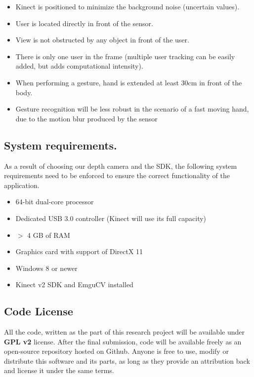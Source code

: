 \documentclass[a4paper,11pt,oneside]{article}
\begin{document}
  \begin{itemize}
 \item Kinect is positioned to minimize the background noise (uncertain values).
  \item User is located directly in front of the sensor.
  \item View is not obstructed by any object in front of the user.
  \item There is only one user in the frame (multiple user tracking can be easily added, but adds computational intensity).
  \item When performing a gesture, hand is extended at least 30cm in front of the body.
\item Gesture recognition will be less robust in the scenario of a fast moving hand, due to the motion blur produced by the sensor
  \end{itemize}

\subsection{System requirements.}

As a result of choosing our depth camera and the SDK, the following system requirements need to be enforced to ensure the correct functionality of the application.

  \begin{itemize}
  \item 64-bit dual-core processor
  \item Dedicated USB 3.0 controller (Kinect will use its full capacity)
  \item $>$ 4 GB of RAM
  \item Graphics card with support of DirectX 11
  \item Windows 8 or newer
 \item Kinect v2 SDK and EmguCV installed
  \end{itemize}

  \subsection{Code License}
  
  All the code, written as the part of this research project will be available under \textbf{GPL v2} license. After the final submission, code will be available freely as an open-source repository hosted on Github. Anyone is free to use, modify or distribute this software and its parts, as long as they provide an attribution back and license it under the same terms.
\end{document}
